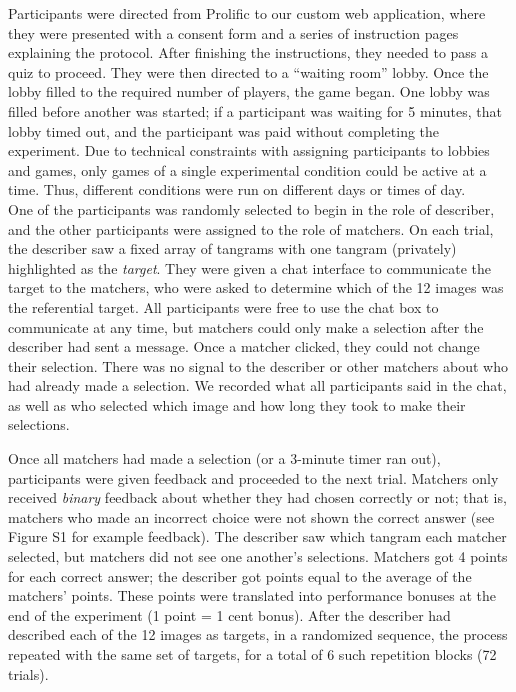 \documentclass[9pt,twocolumn,twoside]{pnas-new}
\begin{document}
{Participants were directed from Prolific to our custom web application,
where they were presented with a consent form and a series of
instruction pages explaining the protocol. After finishing the
instructions, they needed to pass a quiz to proceed. They were then
directed to a ``waiting room'' lobby. Once the lobby filled to the
required number of players, the game began. One lobby was filled before
another was started; if a participant was waiting for 5 minutes, that
lobby timed out, and the participant was paid without completing the
experiment. Due to technical constraints with assigning participants to
lobbies and games, only games of a single experimental condition could
be active at a time. Thus, different conditions were run on different
days or times of day.\\
One of the participants was randomly selected to begin in the role of
describer, and the other participants were assigned to the role of
matchers. On each trial, the describer saw a fixed array of tangrams
with one tangram (privately) highlighted as the \emph{target}. They were
given a chat interface to communicate the target to the matchers, who
were asked to determine which of the 12 images was the referential
target. All participants were free to use the chat box to communicate at
any time, but matchers could only make a selection after the describer
had sent a message. Once a matcher clicked, they could not change their
selection. There was no signal to the describer or other matchers about
who had already made a selection. We recorded what all participants said
in the chat, as well as who selected which image and how long they took
to make their selections.

Once all matchers had made a selection (or a 3-minute timer ran out),
participants were given feedback and proceeded to the next trial.
Matchers only received \emph{binary} feedback about whether they had
chosen correctly or not; that is, matchers who made an incorrect choice
were not shown the correct answer (see Figure S1 for example
feedback). The describer saw which tangram each matcher selected, but
matchers did not see one another's selections. Matchers got 4 points for
each correct answer; the describer got points equal to the average of
the matchers' points. These points were translated into performance
bonuses at the end of the experiment (1 point = 1 cent bonus). After the
describer had described each of the 12 images as targets, in a
randomized sequence, the process repeated with the same set of targets,
for a total of 6 such repetition blocks (72 trials).

}
\end{document}
